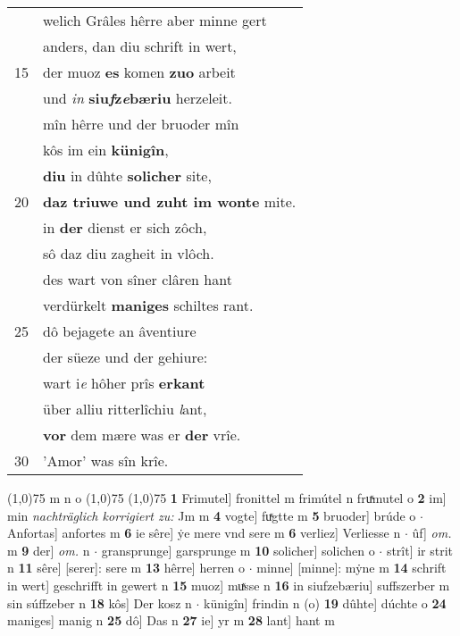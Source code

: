 \documentclass[8pt,a4paper,notitlepage]{article}
\begin{document}
\begin{table}[ht]
\begin{minipage}[t]{0.5\linewidth}
\begin{tabular}{rl}
 & welich Grâles hêrre aber minne gert\\ 
 & anders, dan diu schrift in wert,\\ 
15 & der muoz \textbf{es} komen \textbf{zuo} arbeit\\ 
 & und \textit{in} \textbf{siu\textit{f}z\textit{e}bæriu} herzeleit.\\ 
 & mîn hêrre und der bruoder mîn\\ 
 & kôs im ein \textbf{künigîn},\\ 
 & \textbf{diu} in dûhte \textbf{solicher} site,\\ 
20 & \textbf{daz triuwe und zuht im wonte} mite.\\ 
 & in \textbf{der} dienst er sich zôch,\\ 
 & sô daz diu zagheit in vlôch.\\ 
 & des wart von sîner clâren hant\\ 
 & verdürkelt \textbf{maniges} schiltes rant.\\ 
25 & dô bejagete an âventiure\\ 
 & der süeze und der gehiure:\\ 
 & wart i\textit{e} hôher prîs \textbf{erkant}\\ 
 & über alliu ritterlîchiu \textit{l}ant,\\ 
 & \textbf{vor} dem mære was er \textbf{der} vrîe.\\ 
30 & 'Amor' was sîn krîe.\\ 
\end{tabular}
\scriptsize
\line(1,0){75} \newline
m n o \newline
\line(1,0){75} \newline
\newline
\line(1,0){75} \newline
\textbf{1} Frimutel] fronittel m frimútel n fruͯmutel o \textbf{2} im] min \textit{nachträglich korrigiert zu:} Jm m \textbf{4} vogte] fuͯgtte m \textbf{5} bruoder] brúde o  $\cdot$ Anfortas] anfortes m \textbf{6} ie sêre] ẏe mere vnd sere m \textbf{6} verliez] Verliesse n  $\cdot$ ûf] \textit{om.} m \textbf{9} der] \textit{om.} n  $\cdot$ gransprunge] garsprunge m \textbf{10} solicher] solichen o  $\cdot$ strît] ir strit n \textbf{11} sêre] [serer]: sere m \textbf{13} hêrre] herren o  $\cdot$ minne] [minne]: mẏne m \textbf{14} schrift in wert] geschrifft in gewert n \textbf{15} muoz] muͯsse n \textbf{16} in siufzebæriu] suffszerber m sin súffzeber n \textbf{18} kôs] Der kosz n  $\cdot$ künigîn] frindin n (o) \textbf{19} dûhte] dúchte o \textbf{24} maniges] manig n \textbf{25} dô] Das n \textbf{27} ie] yr m \textbf{28} lant] hant m \newline
\end{minipage}
\end{table}
\end{document}
